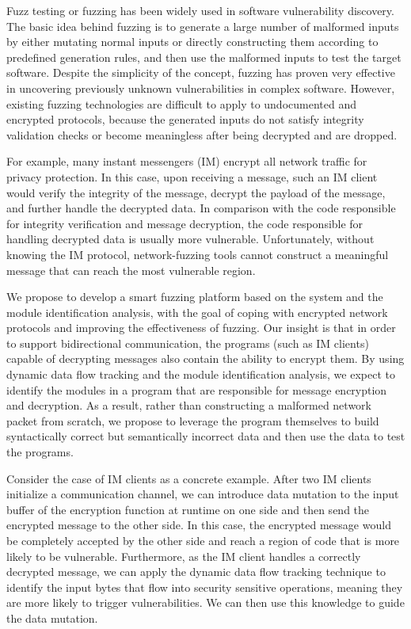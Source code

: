 Fuzz testing or fuzzing has been widely used in software vulnerability
discovery. The basic idea behind fuzzing is to generate a large number
of malformed inputs by either mutating normal inputs or directly
constructing them according to predefined generation rules, and then use
the malformed inputs to test the target software. Despite the simplicity of
the concept, fuzzing has proven very effective in uncovering previously
unknown vulnerabilities in complex software. However, existing fuzzing
technologies are difficult to apply to undocumented and encrypted protocols,
because the generated inputs do not satisfy integrity validation checks or
become meaningless after being decrypted and are dropped.

For example, many instant messengers (IM) encrypt all network
traffic for privacy protection. In this case, upon receiving a message,
such an IM client would verify the integrity of the message, decrypt the
payload of the message, and further handle the decrypted data.  In
comparison with the code responsible for integrity verification and
message decryption, the code responsible for handling decrypted data is
usually more vulnerable. Unfortunately, without knowing the IM protocol,
network-fuzzing tools cannot construct a meaningful message that can
reach the most vulnerable region.

We propose to develop a smart fuzzing platform based on the
\dynamicsys system and the module identification analysis, with the goal
of coping with encrypted network protocols and improving the effectiveness
of fuzzing.  Our insight is that in order to support
bidirectional communication, the programs (such as IM clients) capable
of decrypting messages also contain the ability to encrypt them.
By using dynamic data flow tracking and the module identification
analysis, we expect to identify the modules in a program that are
responsible for message encryption and decryption. As a result, rather
than constructing a malformed network packet from scratch, we
propose to leverage the program themselves to build syntactically
correct but semantically incorrect data and then use the data to test
the programs.

Consider the case of IM clients as a concrete example.  After two IM clients
initialize a communication channel, we can introduce data mutation to the
input buffer of the encryption function at runtime on one side and then send
the encrypted message to the other side. In this case, the encrypted message
would be completely accepted by the other side and reach a region of code that
is more likely to be vulnerable.  Furthermore, as the IM client handles a
correctly decrypted message, we can apply the dynamic data flow tracking
technique to identify the input bytes that flow into security sensitive
operations, meaning they are more likely to trigger vulnerabilities.  We can
then use this knowledge to guide the data mutation.
